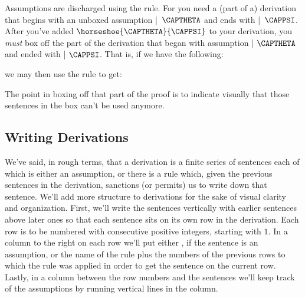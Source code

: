 Assumptions are discharged using the  rule.  For  you need a (part of a) derivation that begins with an unboxed assumption \mbox{| $\CAPTHETA$} and ends with \mbox{| $\CAPPSI$}. 
After you've added $\horseshoe{\CAPTHETA}{\CAPPSI}$ to your derivation, you \emph{must} box off the part of the derivation that began with assumption | $\CAPTHETA$ and ended with | $\CAPPSI$.  That is, if we have the following:

\begin{gproof}[\label{conditionalintro}]
\end{gproof}

\noindent{}we may then use the rule  to get:

\begin{gproof}[\label{conditionalintroclosed}]
\end{gproof}

\noindent{}The point in boxing off that part of the proof is to indicate visually that those sentences in the box can't be used anymore. 

\subsection{Writing Derivations}

We've said, in rough terms, that a derivation is a finite series of sentences each of which is either an assumption, or there is a rule which, given the previous sentences in the derivation, sanctions (or permits) us to write down that sentence. 
We'll add more structure to derivations for the sake of visual clarity and organization. 
First, we'll write the sentences vertically with earlier sentences above later ones so that each sentence sits on its own row in the derivation. 
Each row is to be numbered with consecutive positive integers, starting with $1$.
In a column to the right on each row we'll put either , if the sentence is an assumption, or the name of the rule plus the numbers of the previous rows to which the rule was applied in order to get the sentence on the current row. 
Lastly, in a column between the row numbers and the sentences we'll keep track of the assumptions by running vertical lines in the column.

